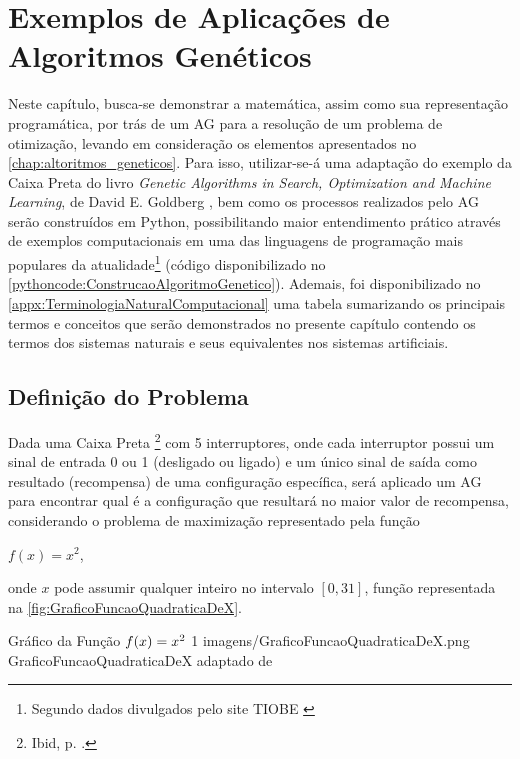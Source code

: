 \chapter{Exemplos de Aplicações de Algoritmos Genéticos}

Neste capítulo, busca-se demonstrar a matemática, assim como sua representação programática, por trás de um AG para a resolução de um problema de otimização, levando em consideração os elementos apresentados no \autoref{chap:altoritmos_geneticos}. Para isso, utilizar-se-á uma adaptação do exemplo da Caixa Preta do livro \textit{Genetic Algorithms in Search, Optimization and Machine Learning}, de David E. Goldberg \citeyearpar{goldberg_genetic_1989}, bem como os processos realizados pelo AG serão construídos em Python, possibilitando maior entendimento prático através de exemplos computacionais em uma das linguagens de programação mais populares da atualidade\footnote{Segundo dados divulgados pelo site TIOBE \citet{noauthor_index_nodate}} (código disponibilizado no \autoref{pythoncode:ConstrucaoAlgoritmoGenetico}). Ademais, foi disponibilizado no \autoref{appx:TerminologiaNaturalComputacional} uma tabela sumarizando os principais termos e conceitos que serão demonstrados no presente capítulo contendo os termos dos sistemas naturais e seus equivalentes nos sistemas artificiais.

\section{Definição do Problema}

Dada uma Caixa Preta \footnote{Ibid, p. \pageref{rodape:problema_caixa_preta}.} com 5 interruptores, onde cada interruptor possui um sinal de entrada 0 ou 1 (desligado ou ligado) e um único sinal de saída como resultado (recompensa) de uma configuração específica, será aplicado um AG para encontrar qual é a configuração que resultará no maior valor de recompensa, considerando o problema de maximização representado pela função

\begin{center}
	$f(x) = x^2$,
\end{center}

\noindent onde $x$ pode assumir qualquer inteiro no intervalo $\left[0, 31\right]$, função representada na \autoref{fig:GraficoFuncaoQuadraticaDeX}.

\figura
	{Gráfico da Função $\lowercase{f}(\lowercase{x}) = \lowercase{x}^2$}
	{1}
	{imagens/GraficoFuncaoQuadraticaDeX.png}
	{GraficoFuncaoQuadraticaDeX}
	{adaptado de \citet[pg.8]{goldberg_genetic_1989}}
	
